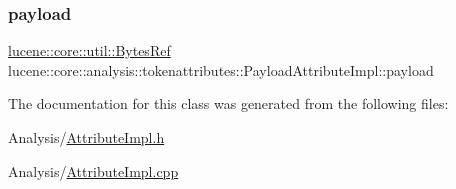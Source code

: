 \subsubsection{\texorpdfstring{payload}{payload}}
{\footnotesize\ttfamily \mbox{\hyperlink{classlucene_1_1core_1_1util_1_1BytesRef}{lucene\+::core\+::util\+::\+Bytes\+Ref}} lucene\+::core\+::analysis\+::tokenattributes\+::\+Payload\+Attribute\+Impl\+::payload\hspace{0.3cm}{\ttfamily [private]}}



The documentation for this class was generated from the following files\+:\begin{DoxyCompactItemize}
\item 
Analysis/\mbox{\hyperlink{AttributeImpl_8h}{Attribute\+Impl.\+h}}\item 
Analysis/\mbox{\hyperlink{AttributeImpl_8cpp}{Attribute\+Impl.\+cpp}}\end{DoxyCompactItemize}
